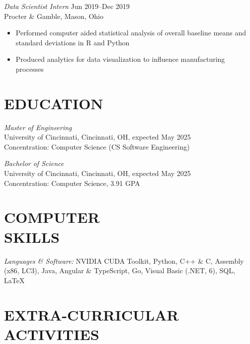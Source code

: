 \documentclass[margin]{res} %
\begin{document}
\begin{resume}
{\sl Data Scientist Intern} \hfill {\color{black} Jun 2019–Dec 2019} \\
Procter \& Gamble, Mason, Ohio
\begin{itemize} \itemsep -2pt %
\item Performed computer aided statistical analysis of overall baseline means and standard deviations in R and Python
\item Produced analytics for data visualization to influence manufacturing processes
\end{itemize}


\section{EDUCATION}

{\sl Master of Engineering }\\
University of Cincinnati, Cincinnati, OH, expected May 2025 \\
Concentration: Computer Science (CS Software Engineering)

{\sl Bachelor of Science}\\
University of Cincinnati, Cincinnati, OH, expected May 2025 \\
Concentration: Computer Science, 3.91 GPA


\section{COMPUTER \\ SKILLS} 

{\sl Languages \& Software:} 
NVIDIA CUDA Toolkit, Python, C++ \& C, Assembly (x86, LC3), Java, Angular \& TypeScript, Go, Visual Basic (.NET, 6), SQL, \LaTeX{} 


\section{EXTRA-CURRICULAR \\ ACTIVITIES} 


\end{resume}
\end{document}
